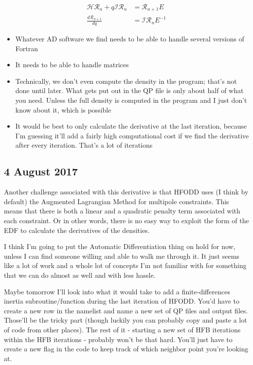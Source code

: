 \documentclass[]{report}
\begin{document}
\begin{eqnarray}
\mathcal{HR}_n+q\mathcal{IR}_n&=\mathcal{R}_{n+1}E \nonumber\\
\frac{d\mathcal{R}_{n+1}}{dq} &= \mathcal{IR}_nE^{-1}
\end{eqnarray}

\begin{itemize}
\item Whatever AD software we find needs to be able to handle several versions of Fortran
\item It needs to be able to handle matrices
\item Technically, we don't even compute the density in the program; that's not done until later. What gets put out in the QP file is only about half of what you need. Unless the full density is computed in the program and I just don't know about it, which is possible
\item It would be best to only calculate the derivative at the last iteration, because I'm guessing it'll add a fairly high computational cost if we find the derivative after every iteration. That's a lot of iterations
\end{itemize}

\subsection*{4 August 2017}
Another challenge associated with this derivative is that HFODD uses (I think by default) the Augmented Lagrangian Method for multipole constraints. This means that there is both a linear and a quadratic penalty term associated with each constraint. Or in other words, there is no easy way to exploit the form of the EDF to calculate the derivatives of the densities.

I think I'm going to put the Automatic Differentiation thing on hold for now, unless I can find someone willing and able to walk me through it. It just seems like a lot of work and a whole lot of concepts I'm not familiar with for something that we can do almost as well and with less hassle.

Maybe tomorrow I'll look into what it would take to add a finite-differences inertia subroutine/function during the last iteration of HFODD. You'd have to create a new row in the namelist and name a new set of QP files and output files. Those'll be the tricky part (though luckily you can probably copy and paste a lot of code from other places). The rest of it - starting a new set of HFB iterations within the HFB iterations - probably won't be that hard. You'll just have to create a new flag in the code to keep track of which neighbor point you're looking at.
\end{document}
